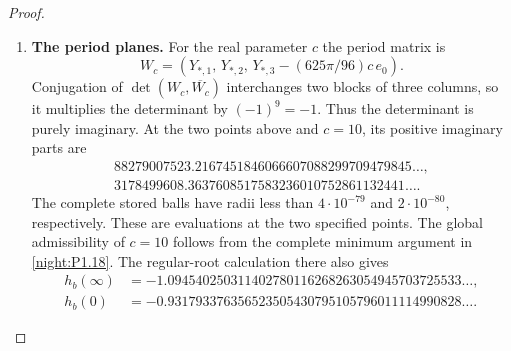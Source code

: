 \begin{proof}
\begin{enumerate}[label={$\langle1\rangle$\arabic*.}]
\item \textbf{The period planes.}
For the real parameter $c$ the period matrix is
\[
 W_c=(Y_{*,1},\,Y_{*,2},\,Y_{*,3}-(625\pi/96)c\,e_0).
\]
Conjugation of $\det(W_c,\overline{W_c})$ interchanges two blocks
of three columns, so it multiplies the determinant by $(-1)^9=-1$.
Thus the determinant is purely imaginary.  At the two points above
and $c=10$, its positive imaginary parts are
\[
\begin{gathered}
 88279007523.2167451846066607088299709479845\ldots,\\
 3178499608.3637608517583236010752861132441\ldots .
\end{gathered}
\]
The complete stored balls have radii less than $4\cdot10^{-79}$
and $2\cdot10^{-80}$, respectively.  These are evaluations at the
two specified points.  The global admissibility of $c=10$ follows
from the complete minimum argument in \cref{night:P1.18}.  The regular-root
calculation there also gives
\[
\begin{split}
 h_b(\infty)&=-1.094540250311402780116268263054945703725533\ldots,\\
 h_b(0)&=-0.931793376356523505430795105796011114990828\ldots .
\end{split}
\]

\end{enumerate}
\end{proof}




